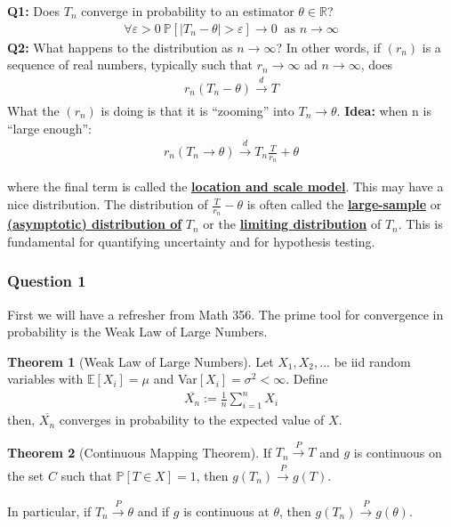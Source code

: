 \documentclass[11pt]{scrartcl}
\newcommand{\R}[0]{\mathbb{R}}
\theoremstyle{definition}
\newtheorem{theorem}{Theorem}
\theoremstyle{remark}
\newcommand{\dfn}[1]{\textbf{\underline{#1}}}
\newcommand{\pr}[1]{\mathbb{P}[#1]}
\newcommand{\EX}[1]{\mathbb{E}\left[#1 \right]}
\begin{document}
{\begin{center}
	\textbf{Q1:} Does $T_n$ converge in probability to an estimator $\theta \in \R$? 
	\begin{align}
			\forall \varepsilon > 0\ \pr{ | T_n - \theta | > \varepsilon } \rightarrow 0\ \text{ as } n \rightarrow \infty 
	\end{align} 
	\textbf{Q2:} What happens to the distribution as $n \rightarrow \infty$? In other words, if $(r_n)$ is a sequence of real numbers, typically such that $r_n \rightarrow \infty$ ad $n \rightarrow \infty$, does
	\begin{align} 
			r_n ( T_n - \theta) \xrightarrow[]{d} T
	\end{align}
	What the $(r_n)$ is doing is that it is ``zooming'' into $T_n \rightarrow \theta$.  
	\textbf{Idea:}  when n is ``large enough'': 
	\begin{align*} 
		r_n(T_n \rightarrow \theta) \xrightarrow[]{d} T_n \frac{T}{r_n} + \theta 
	\end{align*}
\end{center}
where the final term is called the \dfn{location and scale model}. This may have a nice distribution. The distribution of $\frac{T}{r_n} - \theta$ is often called the \dfn{large-sample} or \dfn{(asymptotic) distribution of} $T_n$ or the \dfn{limiting distribution} of $T_n$. This is fundamental for quantifying uncertainty and for hypothesis testing. 

\subsubsection{Question 1}

First we will have a refresher from Math 356. The prime tool for convergence in probability is the Weak Law of Large Numbers. 

\begin{theorem}[Weak Law of Large Numbers] 
	Let $X_1, X_2, ...$ be iid random variables with $\EX{X_i} = \mu$ and Var$[X_i] = \sigma^2 < \infty$. Define 
	\begin{align}
		\overline{X_n} :=  \frac{1}{n} \sum_{i=1}^n X_i
	\end{align}
	then, $\overline{X_n}$ converges in probability to the expected value of $X$. 
\end{theorem}

\begin{theorem}[Continuous Mapping Theorem]
	If $T_n \xrightarrow[]{P} T$ and $g$ is continuous on the set $C$ such that $\pr{T \in X} =1$, then $g(T_n) \xrightarrow[]{P} g(T)$. 
\end{theorem}
	In particular, if $T_n \xrightarrow[]{P} \theta$ and if $g$ is continuous at $\theta$, then $g(T_n) \xrightarrow[]{P} g(\theta)$.
	
}
\end{document}
